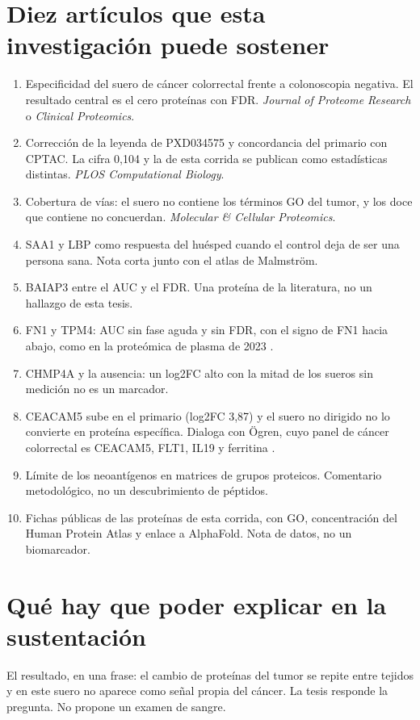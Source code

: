 \documentclass[11pt]{article}
\begin{document}
\section{Diez artículos que esta investigación puede sostener}
\begin{enumerate}
\item Especificidad del suero de cáncer colorrectal frente a colonoscopia negativa. El resultado central es el cero proteínas con FDR. \textit{Journal of Proteome Research} o \textit{Clinical Proteomics}.
\item Corrección de la leyenda de PXD034575 y concordancia del primario con CPTAC. La cifra 0,104 y la de esta corrida se publican como estadísticas distintas. \textit{PLOS Computational Biology}.
\item Cobertura de vías: el suero no contiene los términos GO del tumor, y los doce que contiene no concuerdan. \textit{Molecular \& Cellular Proteomics}.
\item SAA1 y LBP como respuesta del huésped cuando el control deja de ser una persona sana. Nota corta junto con el atlas de Malmström.
\item BAIAP3 entre el AUC y el FDR. Una proteína de la literatura, no un hallazgo de esta tesis.
\item FN1 y TPM4: AUC sin fase aguda y sin FDR, con el signo de FN1 hacia abajo, como en la proteómica de plasma de 2023 \cite{verathamjamras2023}.
\item CHMP4A y la ausencia: un log2FC alto con la mitad de los sueros sin medición no es un marcador.
\item CEACAM5 sube en el primario (log2FC 3,87) y el suero no dirigido no lo convierte en proteína específica. Dialoga con Ögren, cuyo panel de cáncer colorrectal es CEACAM5, FLT1, IL19 y ferritina \cite{ogren2026}.
\item Límite de los neoantígenos en matrices de grupos proteicos. Comentario metodológico, no un descubrimiento de péptidos.
\item Fichas públicas de las proteínas de esta corrida, con GO, concentración del Human Protein Atlas y enlace a AlphaFold. Nota de datos, no un biomarcador.
\end{enumerate}

\section{Qué hay que poder explicar en la sustentación}
El resultado, en una frase: el cambio de proteínas del tumor se repite entre tejidos y en este suero no aparece como señal propia del cáncer. La tesis responde la pregunta. No propone un examen de sangre.
\end{document}
